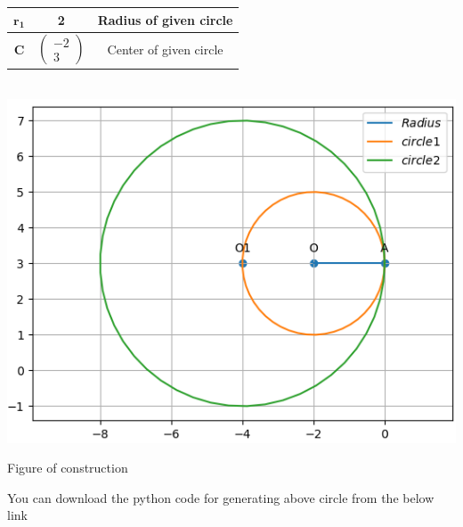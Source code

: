 \documentclass[10pt,a4paper]{report}
\newcommand{\myvec}[1]{\ensuremath{\begin{pmatrix}#1\end{pmatrix}}}
\let\vec\mathbf
\begin{document}
\begin{multicols}{2}
\begin{tabular}{|c|c|c|}
	 \hline
	 $\vec{r_1}$ & 2 & Radius of given circle\\
	 \hline
	 $\vec{C}$ & $\myvec{-2 \\ 3}$ & Center of given circle\\
	 \hline
\end{tabular}
\vspace{0.5cm}\\
\includegraphics[scale=0.4]{circle2.png}
\begin{center}
Figure of construction
\end{center} 
You can download the python code for generating above circle from the below link
\vspace{0.25cm}\\

\end{multicols}
\end{document}
